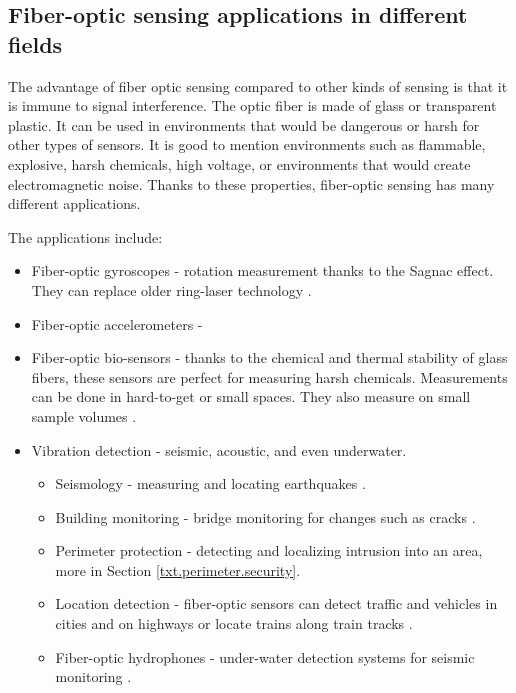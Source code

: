 \subsection{Fiber-optic sensing applications in different fields}\label{txt.sensing.usage}

The advantage of fiber optic sensing compared to other kinds of sensing is that it is immune to signal interference. The optic fiber is made of glass or transparent plastic. It can be used in environments that would be dangerous or harsh for other types of sensors. It is good to mention environments such as flammable, explosive, harsh chemicals, high voltage, or environments that would create electromagnetic noise. Thanks to these properties, fiber-optic sensing has many different applications.

The applications include:

\begin{itemize}
    \item Fiber-optic gyroscopes - rotation measurement thanks to the Sagnac effect. They can replace older ring-laser technology \cite{fog}.
    \item Fiber-optic accelerometers - %
    \item Fiber-optic bio-sensors - thanks to the chemical and thermal stability of glass fibers, these sensors are perfect for measuring harsh chemicals. Measurements can be done in hard-to-get or small spaces. They also measure on small sample volumes \cite{chemsens}.
    \item Vibration detection - seismic, acoustic,  and even underwater.
    \begin{itemize}
        \item Seismology - measuring and locating earthquakes \cite{dasKislov}.
        \item Building monitoring - bridge monitoring for changes such as cracks \cite{DVSShanFu}.
        \item Perimeter protection - detecting and localizing intrusion into an area, more in Section \ref{txt.perimeter.security}.
        \item Location detection - fiber-optic sensors can detect traffic and vehicles in cities and on highways or locate trains along train tracks \cite{dasKislov}.
        \item Fiber-optic hydrophones - under-water detection systems for seismic monitoring \cite{hydrophones}.
    \end{itemize}
\end{itemize}



